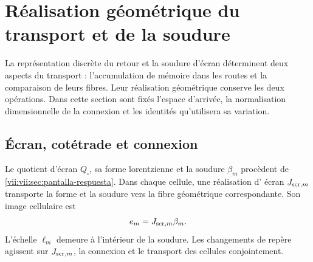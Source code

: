 
\section{Réalisation géométrique du transport et de la soudure}
\label{vii:vii:sec:realizacion-cartan}

La représentation discrète du retour et la soudure d'écran déterminent deux aspects du transport : l'accumulation de mémoire dans les routes et la comparaison de leurs fibres. Leur réalisation géométrique conserve les deux opérations. Dans cette section sont fixés l'espace d'arrivée, la normalisation dimensionnelle de la connexion et les identités qu'utilisera sa variation.

\subsection{Écran, cotétrade et connexion}

Le quotient d'écran \(Q_\square\), sa forme lorentzienne et la
soudure \(\beta_m\) procèdent de
\ref{vii:vii:sec:pantalla-respuesta}. Dans chaque cellule, une réalisation d'
écran \(J_{{\rm scr},m}\) transporte la forme et la soudure
vers la fibre géométrique correspondante. Son image cellulaire est
\[
 e_m=J_{{\rm scr},m}\beta_m.
\]
L'échelle \(\ell_m\) demeure à l'intérieur de la soudure. Les
changements de repère agissent sur \(J_{{\rm scr},m}\), la connexion
et le transport des cellules conjointement.

